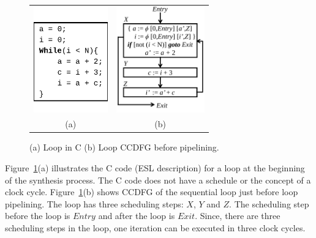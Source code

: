 \begin{figure}[H]%
\begin{center}
\begin{tabular}{cc}
\includegraphics[height=1.8in]{fig-rpe/C-code}
& \hspace{2cm}
\includegraphics[height=1.8in]{fig-rpe/seq-ccdfg}
\\
(a) & \hspace{2cm} (b) 
\end{tabular}
\end{center}
\caption{(a) Loop in C (b) Loop CCDFG before pipelining.}
\label{fig:high-level-synthesis}
\end{figure}

Figure~\ref{fig:high-level-synthesis}(a) illustrates the C
code (ESL description) for a loop at the beginning of the
synthesis process. The C code does not have a schedule or the
concept of a clock cycle. Figure~\ref{fig:high-level-synthesis}(b)
shows CCDFG of the sequential loop just before loop pipelining. The loop has three scheduling steps: $X$, $Y$ and $Z$.  The scheduling step before the loop is $Entry$ and after the loop is $Exit$. Since,
there are three scheduling steps in the loop, one iteration
can be executed in three clock cycles.

